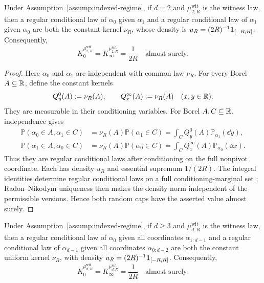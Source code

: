 \begin{proposition}
\label{prop:degree-two-witness-kernels}
Under Assumption~\ref{assump:indexed-regime}, if $d=2$ and
$\mu^{\mathrm{wit}}_{2,R}$ is the witness law, then a regular conditional
law of $\alpha_0$ given $\alpha_1$ and a regular conditional law of
$\alpha_1$ given $\alpha_0$ are both the constant kernel $\nu_R$, whose
density is $u_R=(2R)^{-1}\mathbf{1}_{[-R,R]}$.  Consequently,
\[
K_0^{\mu^{\mathrm{wit}}_{2,R}}
=K_\infty^{\mu^{\mathrm{wit}}_{2,R}}
=\frac1{2R}
\quad\text{almost surely}.
\]
\end{proposition}

\begin{proof}
Here $\alpha_0$ and $\alpha_1$ are independent with common law $\nu_R$.
For every Borel $A\subseteq\mathbb{R}$, define the constant kernels
\[
Q^0_y(A):=\nu_R(A),\qquad Q^\infty_x(A):=\nu_R(A)
\quad(x,y\in\mathbb{R}).
\]
They are measurable in their conditioning variables.  For Borel
$A,C\subseteq\mathbb{R}$, independence gives
\[
\begin{aligned}
\mathbb P(\alpha_0\in A,\alpha_1\in C)
&=\nu_R(A)\mathbb P(\alpha_1\in C)
=\int_CQ^0_y(A)\mathbb P_{\alpha_1}(\dd y),\\
\mathbb P(\alpha_1\in A,\alpha_0\in C)
&=\nu_R(A)\mathbb P(\alpha_0\in C)
=\int_CQ^\infty_x(A)\mathbb P_{\alpha_0}(\dd x).
\end{aligned}
\]
Thus they are regular conditional laws after conditioning on the full
nonpivot coordinate.  Each has density $u_R$ and essential supremum
$1/(2R)$.  The integral identities determine regular conditional laws on a
full conditioning-marginal set \cite[Theorem~6.3]{Kallenberg2002};
Radon--Nikodym uniqueness \cite[Theorem~3.8]{Folland1999} then makes the
density norm independent of the permissible versions.  Hence both random
caps have the asserted value almost surely.
\end{proof}

\begin{proposition}
\label{prop:higher-degree-witness-kernels}
Under Assumption~\ref{assump:indexed-regime}, if $d\geq3$ and
$\mu^{\mathrm{wit}}_{d,R}$ is the witness law, then a regular conditional
law of $\alpha_0$ given all coordinates $\alpha_{1:d-1}$ and a regular
conditional law of $\alpha_{d-1}$ given all coordinates
$\alpha_{0:d-2}$ are both the constant uniform kernel $\nu_R$, with density
$u_R=(2R)^{-1}\mathbf{1}_{[-R,R]}$.  Consequently,
\[
K_0^{\mu^{\mathrm{wit}}_{d,R}}
=K_\infty^{\mu^{\mathrm{wit}}_{d,R}}
=\frac1{2R}
\quad\text{almost surely}.
\]
\end{proposition}

